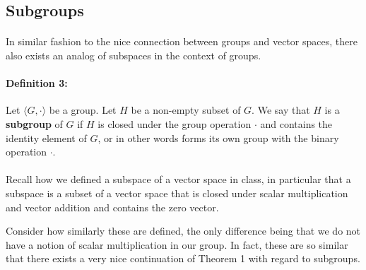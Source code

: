 \documentclass[twoside]{article}
\begin{document}
\begin{spacing}{1.25}
\section{Subgroups}

\paragraph{} In similar fashion to the nice connection between groups and vector spaces,
there also exists an analog of subspaces in the context of groups.
\paragraph*{Definition 3:} Let $\langle G, \cdot \rangle$ be a group. Let $H$ be a non-empty subset of $G$.
We say that $H$ is a \textbf{subgroup} of $G$ if $H$ is closed under the group operation $\cdot$
and contains the identity element of $G$,
or in other words forms its own group with the binary operation $\cdot$.

\paragraph*{} Recall how we defined a subspace of a vector space in class, in 
particular that a subspace is a subset of a vector space that is closed under
scalar multiplication and vector addition and contains the zero vector.

Consider how similarly these are defined, the only difference being that 
we do not have a notion of scalar multiplication in our group. In fact, these 
are so similar that there exists a very nice continuation of Theorem 1 with 
regard to subgroups.


\end{spacing}
\end{document}
